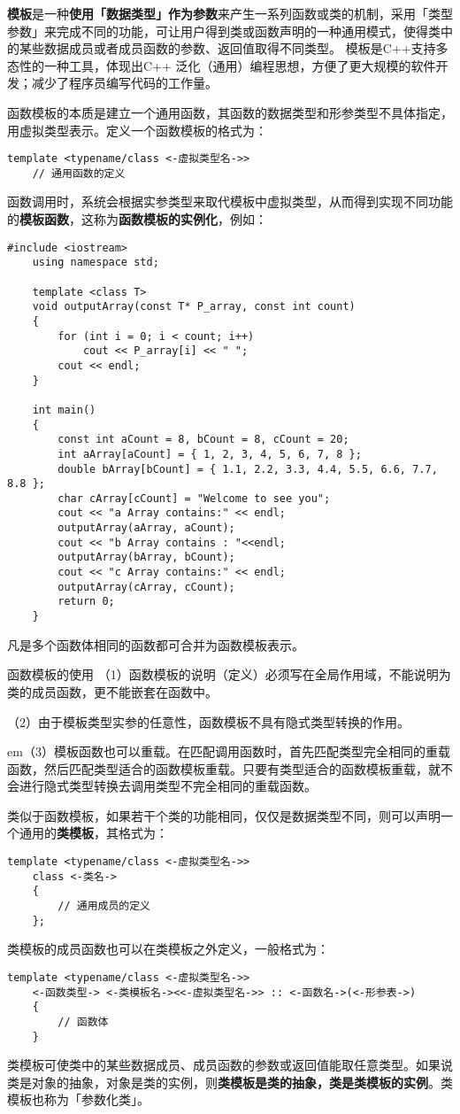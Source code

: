 \documentclass[10pt, a4paper, oneside, fontset=none]{ctexart}
\theoremstyle{plain}
\theoremstyle{definition}
\newcommand{\colors}[1]{\color{#1!75!black}}
\newcommand{\hang}[1][1]{\hangafter 1 \hangindent #1em}
\newcommand{\zhu}[2][]{\begin{note}{#1}\xiu #2\end{note}}
\newcommand{\tboba}[1]{\textbf{\kai\color{bali!75!black}#1}}
\begin{document}
\tboba{模板}是一种\textbf{使用「数据类型」作为参数}来产生一系列函数或类的机制，采用「类型参数」来完成不同的功能，可让用户得到类或函数声明的一种通用模式，使得类中的某些数据成员或者成员函数的参数、返回值取得不同类型。
模板是C++支持多态性的一种工具，体现出C++ 泛化（通用）编程思想，方便了更大规模的软件开发；减少了程序员编写代码的工作量。

函数模板的本质是建立一个通用函数，其函数的数据类型和形参类型不具体指定，用虚拟类型表示。定义一个函数模板的格式为：
\begin{lstlisting}[style=intro]
	template <typename/class <-虚拟类型名->>
	// 通用函数的定义
\end{lstlisting}
函数调用时，系统会根据实参类型来取代模板中虚拟类型，从而得到实现不同功能的\tboba{模板函数}，这称为\tboba{函数模板的实例化}，例如：
\begin{lstlisting}[moreemph={T}, emphstyle=\colors{qinglv}, 
	moreemph={[2]{P_array, count, aCount, bCount, cCount, aArray, bArray, cArray, i}}, emphstyle={[2]\it\ttfamily}]
	#include <iostream>
	using namespace std;
	
	template <class T>
	void outputArray(const T* P_array, const int count)
	{
		for (int i = 0; i < count; i++)
			cout << P_array[i] << " ";
		cout << endl;
	}
	
	int main()
	{
		const int aCount = 8, bCount = 8, cCount = 20;
		int aArray[aCount] = { 1, 2, 3, 4, 5, 6, 7, 8 };
		double bArray[bCount] = { 1.1, 2.2, 3.3, 4.4, 5.5, 6.6, 7.7, 8.8 };
		char cArray[cCount] = "Welcome to see you"; 
		cout << "a Array contains:" << endl; 
		outputArray(aArray, aCount); 
		cout << "b Array contains : "<<endl;
		outputArray(bArray, bCount);
		cout << "c Array contains:" << endl;
		outputArray(cArray, cCount);
		return 0;
	}
\end{lstlisting}
凡是多个函数体相同的函数都可合并为函数模板表示。
\zhu[函数模板的使用]{
	（1）函数模板的说明（定义）必须写在全局作用域，不能说明为类的成员函数，更不能嵌套在函数中。

	（2）由于模板类型实参的任意性，函数模板不具有隐式类型转换的作用。
	
	\hang[2]（3）模板函数也可以重载。在匹配调用函数时，首先匹配类型完全相同的重载函数，然后匹配类型适合的函数模板重载。只要有类型适合的函数模板重载，就不会进行隐式类型转换去调用类型不完全相同的重载函数。
}

类似于函数模板，如果若干个类的功能相同，仅仅是数据类型不同，则可以声明一个通用的\tboba{类模板}，其格式为：
\begin{lstlisting}[style=intro]
	template <typename/class <-虚拟类型名->>
	class <-类名->
	{
		// 通用成员的定义
	};
\end{lstlisting}
类模板的成员函数也可以在类模板之外定义，一般格式为：
\begin{lstlisting}[style=intro]
	template <typename/class <-虚拟类型名->>
	<-函数类型-> <-类模板名-><<-虚拟类型名->> :: <-函数名->(<-形参表->)
	{
		// 函数体
	}
\end{lstlisting}
类模板可使类中的某些数据成员、成员函数的参数或返回值能取任意类型。如果说类是对象的抽象，对象是类的实例，则\textbf{类模板是类的抽象，类是类模板的实例}。类模板也称为「参数化类」。
\end{document}
